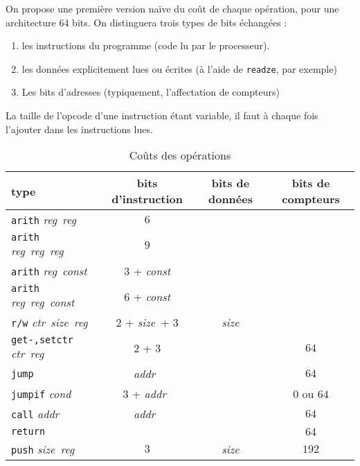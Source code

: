 \documentclass[architecture]{compas2018}
\newcommand{\reg}{\textit{reg}}
\newcommand{\const}{\textit{const}}
\newcommand{\cond}{\textit{cond}}
\newcommand{\ctr}{\textit{ctr}}
\newcommand{\size}{\textit{size}}
\newcommand{\addr}{\textit{addr}}
\begin{document}
\begin{table}[!h]
  \caption{Coûts des opérations}
  \label{tab:costs}
  On propose une première version naïve du coût de chaque opération, pour une architecture 64 bits.
  On distinguera trois types de bits échangées :
  \begin{enumerate}
  \item les instructions du programme (code lu par le processeur).
  \item les données explicitement lues ou écrites (à l'aide de \texttt{readze}, par exemple)
  \item Les bits d'adresses (typiquement, l'affectation de compteurs)
  \end{enumerate}
La taille de l'opcode d'une instruction étant variable, il faut à chaque fois l'ajouter dans les instructions lues.
  \begin{center}
  \begin{tabular}{|l|c|c|c|}
    \hline  
    type & bits d'instruction & bits de données & bits de compteurs \\
    \hline  
    \hline
    \texttt{arith} \reg\ \reg\ & $6$                &    &      \\
    \hline
    \texttt{arith} \reg\ \reg\ \reg\   & $9$   &    &      \\
    \hline
    \texttt{arith} \reg\ \const\       & $3$ + \const       &    &      \\
    \hline
    \texttt{arith} \reg\ \reg\ \const\ & $6$ + \const       &    &      \\
    \hline
    \texttt{r/w} \ctr\ \size\ \reg     & $2$ + \size\ + $3$ & \size           &      \\
    \hline
    \texttt{get-,setctr} \ctr\ \reg\   & $2$ + $3$          &    & $64$              \\
    \hline
    \texttt{jump}         & \addr\             &    & $64$              \\
    \hline
    \texttt{jumpif} \cond & $3$ + \addr\       &    & $0$ ou $64$       \\
    \hline
    \texttt{call} \addr   & \addr\             &    & $64$              \\
    \hline
    \texttt{return}       &       &    & $64$              \\
    \hline
    \texttt{push} \size\ \reg          & $3$   & \size           & $192$             \\
    \hline
  \end{tabular}
  \end{center}

\end{table}
\end{document}
